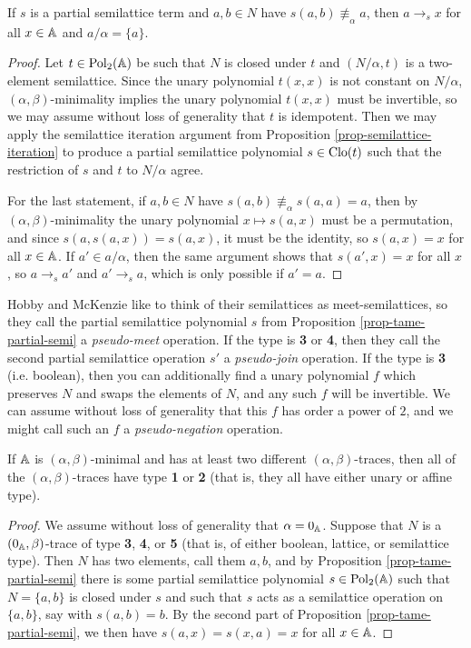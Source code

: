 \begin{appendices}
\begin{prop}
If $s$ is a partial semilattice term and $a,b \in N$ have $s(a,b) \not\equiv_\alpha a$, then $a \rightarrow_s x$ for all $x \in \mathbb{A}$ and $a/\alpha = \{a\}$.
\end{prop}
\begin{proof} Let $t \in \operatorname{Pol}_2(\mathbb{A})$ be such that $N$ is closed under $t$ and $(N/\alpha, t)$ is a two-element semilattice. Since the unary polynomial $t(x,x)$ is not constant on $N/\alpha$, $(\alpha,\beta)$-minimality implies the unary polynomial $t(x,x)$ must be invertible, so we may assume without loss of generality that $t$ is idempotent. Then we may apply the semilattice iteration argument from Proposition \ref{prop-semilattice-iteration} to produce a partial semilattice polynomial $s \in \operatorname{Clo}(t)$ such that the restriction of $s$ and $t$ to $N/\alpha$ agree.

For the last statement, if $a,b \in N$ have $s(a,b) \not\equiv_\alpha s(a,a) = a$, then by $(\alpha,\beta)$-minimality the unary polynomial $x \mapsto s(a,x)$ must be a permutation, and since $s(a,s(a,x)) = s(a,x)$, it must be the identity, so $s(a,x) = x$ for all $x \in \mathbb{A}$. If $a' \in a/\alpha$, then the same argument shows that $s(a',x) = x$ for all $x$, so $a \rightarrow_s a'$ and $a' \rightarrow_s a$, which is only possible if $a' = a$.
\end{proof}

Hobby and McKenzie \cite{hobby-mckenzie} like to think of their semilattices as meet-semilattices, so they call the partial semilattice polynomial $s$ from Proposition \ref{prop-tame-partial-semi} a \emph{pseudo-meet} operation. If the type is \textbf{3} or \textbf{4}, then they call the second partial semilattice operation $s'$ a \emph{pseudo-join} operation. If the type is \textbf{3} (i.e. boolean), then you can additionally find a unary polynomial $f$ which preserves $N$ and swaps the elements of $N$, and any such $f$ will be invertible. We can assume without loss of generality that this $f$ has order a power of $2$, and we might call such an $f$ a \emph{pseudo-negation} operation.

\begin{prop}\label{prop-single-trace} If $\mathbb{A}$ is $(\alpha,\beta)$-minimal and has at least two different $(\alpha,\beta)$-traces, then all of the $(\alpha,\beta)$-traces have type \textbf{1} or \textbf{2} (that is, they all have either unary or affine type).
\end{prop}
\begin{proof} We assume without loss of generality that $\alpha = 0_{\mathbb{A}}$. Suppose that $N$ is a $(0_{\mathbb{A}},\beta)$-trace of type \textbf{3}, \textbf{4}, or \textbf{5} (that is, of either boolean, lattice, or semilattice type). Then $N$ has two elements, call them $a,b$, and by Proposition \ref{prop-tame-partial-semi} there is some partial semilattice polynomial $s \in \operatorname{Pol}_2(\mathbb{A})$ such that $N = \{a,b\}$ is closed under $s$ and such that $s$ acts as a semilattice operation on $\{a,b\}$, say with $s(a,b) = b$. By the second part of Proposition \ref{prop-tame-partial-semi}, we then have $s(a,x) = s(x,a) = x$ for all $x \in \mathbb{A}$.


\end{proof}
\end{appendices}
